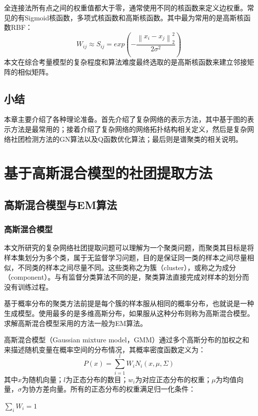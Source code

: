 \documentclass[a4paper,12pt,openany,oneside,utf-8]{ctexbook}
\begin{document}
    全连接法所有点之间的权重值都大于零，通常使用不同的核函数来定义边权重。常见的有Sigmoid核函数，多项式核函数和高斯核函数。其中最为常用的是高斯核函数RBF：
    \begin{equation}
        W_{i j}\approx S_{i j}=exp(-\frac{\left \| x_i-x_j\right \|^2_2}{2\sigma^2})
    \end{equation}
    本文在综合考量模型的复杂程度和算法难度最终选取的是高斯核函数来建立邻接矩阵的相似矩阵。
    \section{小结}
    本章主要介绍了各种理论准备。首先介绍了复杂网络的表示方法，其中基于图的表示方法是最常用的；接着介绍了复杂网络的网络拓扑结构相关定义，然后是复杂网络社团检测方法的GN算法以及Q函数优化算法；最后则是谱聚类的相关说明。
    
    \chapter{基于高斯混合模型的社团提取方法}
	\section{高斯混合模型与EM算法}
	\subsection{高斯混合模型}

    本文所研究的复杂网络社团提取问题可以理解为一个聚类问题，而聚类其目标是将样本集划分为多个类，属于无监督学习问题，目的是保证同一类的样本之间尽量相似，不同类的样本之间尽量不同。这些类称之为簇（cluster），或称之为成分（component）。与有监督分类算法不同的是，聚类算法直接完成对样本的划分而没有训练过程。
    
    基于概率分布的聚类方法前提是每个簇的样本服从相同的概率分布，也就说是一种生成模型。使用最多的是多维高斯分布，如果服从这种分布则称为高斯混合模型。求解高斯混合模型采用的方法一般为EM算法。
    
    高斯混合模型（Gaussian mixture model，GMM）通过多个高斯分布的加权之和来描述随机变量在概率空间的分布情况，其概率密度函数定义为：
    \begin{equation}\label{1}
        P(x) = \sum_{i=1}^l W_i N_i(x,\mu,\Sigma)
    \end{equation}
	其中$x$为随机向量；$l$为正态分布的数目；$w_i$为对应正态分布的权重；$\mu$为均值向量，$\sigma$为协方差向量。所有的正态分布的权重满足归一化条件：
    \begin{center}
        $\sum_i W_i=1$
    \end{center}
    
\end{document}
